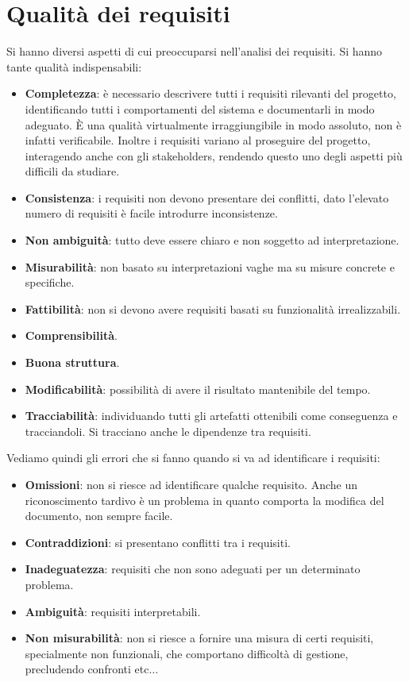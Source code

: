 \section{Qualità dei requisiti}
Si hanno diversi aspetti di cui preoccuparsi nell'analisi dei requisiti. Si hanno
tante qualità indispensabili:
\begin{itemize}
      \item \textbf{Completezza}: è necessario descrivere tutti i requisiti rilevanti
            del progetto, identificando tutti i comportamenti del sistema e documentarli
            in modo adeguato. È una qualità virtualmente irraggiungibile in modo assoluto,
            non è infatti verificabile. Inoltre i requisiti variano al proseguire del
            progetto, interagendo anche con gli stakeholders, rendendo questo uno degli
            aspetti più difficili da studiare.
      \item \textbf{Consistenza}: i requisiti non devono presentare dei conflitti,
            dato l'elevato numero di requisiti è facile introdurre inconsistenze.
      \item \textbf{Non ambiguità}: tutto deve essere chiaro e non soggetto ad
            interpretazione.
      \item \textbf{Misurabilità}: non basato su interpretazioni vaghe ma su misure
            concrete e specifiche.
      \item \textbf{Fattibilità}: non si devono avere requisiti basati su
            funzionalità irrealizzabili.
      \item \textbf{Comprensibilità}.
      \item \textbf{Buona struttura}.
      \item \textbf{Modificabilità}: possibilità di avere il risultato mantenibile
            del tempo.
      \item \textbf{Tracciabilità}: individuando tutti gli artefatti ottenibili
            come conseguenza e tracciandoli. Si tracciano anche le dipendenze tra requisiti.
\end{itemize}
Vediamo quindi gli errori che si fanno quando si va ad identificare i requisiti:
\begin{itemize}
      \item \textbf{Omissioni}: non si riesce ad identificare qualche requisito.
            Anche un riconoscimento tardivo è un problema in quanto comporta la modifica
            del documento, non sempre facile.
      \item \textbf{Contraddizioni}: si presentano conflitti tra i requisiti.
      \item \textbf{Inadeguatezza}: requisiti che non sono adeguati per un determinato
            problema.
      \item \textbf{Ambiguità}: requisiti interpretabili.
      \item \textbf{Non misurabilità}: non si riesce a fornire una misura di certi
            requisiti, specialmente non funzionali, che comportano difficoltà di gestione,
            precludendo confronti etc$\dots$
\end{itemize}
